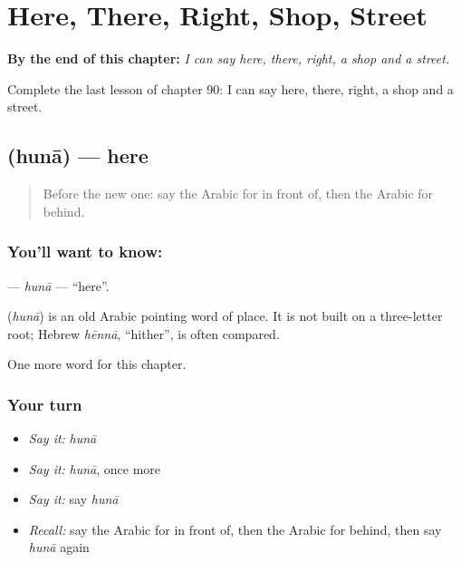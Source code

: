 
\chapter{Here, There, Right, Shop, Street}
\label{ch:ar-here-there-right-shop-street}

\begin{chapteropening}
\textbf{By the end of this chapter:} \emph{I can say here, there, right, a shop and a street.}

Complete the last lesson of chapter 90: I can say here, there, right, a shop and a street.
\end{chapteropening}

\section[\texorpdfstring{\ar{هنا} (hunā)}{هنا (hunā)}]{ (hunā) — here}

\label{lesson:AR-C90-huna}



\begin{quote}
Before the new one: say the Arabic for in front of, then the Arabic for behind.
\end{quote}

\subsection*{You'll want to know: }
\textbf{} — \emph{hunā} — \textquotedblleft{}here\textquotedblright{}.

\begin{cousinweb}
\textbf{} (\emph{hunā}) is an old Arabic pointing word of place. It is not built on a three-letter root; Hebrew \emph{hēnnā}, \textquotedblleft{}hither\textquotedblright{}, is often compared.
\end{cousinweb}

\begin{grammarlens}[title={What you've built}]
One more word for this chapter.
\end{grammarlens}

\subsection*{Your turn}
\begin{itemize}
\raggedright
  \item \emph{Say it:} \emph{hunā}
  \item \emph{Say it:} \emph{hunā}, once more
  \item \emph{Say it:} say \emph{hunā}
  \item \emph{Recall:} say the Arabic for in front of, then the Arabic for behind, then say \emph{hunā} again
\end{itemize}

